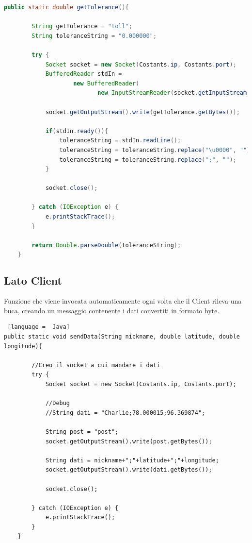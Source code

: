 \documentclass[a4paper,11pt]{report}
\begin{document}
\begin{lstlisting}[language = Java]
public static double getTolerance(){

        String getTolerance = "toll";
        String toleranceString = "0.000000";

        try {
            Socket socket = new Socket(Costants.ip, Costants.port);
            BufferedReader stdIn =
                    new BufferedReader(
                           new InputStreamReader(socket.getInputStream()));

            socket.getOutputStream().write(getTolerance.getBytes());

            if(stdIn.ready()){
                toleranceString = stdIn.readLine();
                toleranceString = toleranceString.replace("\u0000", "");
                toleranceString = toleranceString.replace(";", "");
            }

            socket.close();

        } catch (IOException e) {
            e.printStackTrace();
        }

        return Double.parseDouble(toleranceString);
    }

\end{lstlisting}


\subsection{Lato Client}
Funzione che viene invocata automaticamente ogni volta che il Client rileva una buca, creando  un messaggio contenente i dati convertiti in formato byte.

\begin{lstlisting} [language =  Java]
public static void sendData(String nickname, double latitude, double longitude){

        //Creo il socket a cui mandare i dati
        try {
            Socket socket = new Socket(Costants.ip, Costants.port);

            //Debug
            //String dati = "Charlie;78.000015;96.369874";

            String post = "post";
            socket.getOutputStream().write(post.getBytes());

            String dati = nickname+";"+latitude+";"+longitude;
            socket.getOutputStream().write(dati.getBytes());

            socket.close();

        } catch (IOException e) {
            e.printStackTrace();
        }
    }

\end{lstlisting}
\end{document}
